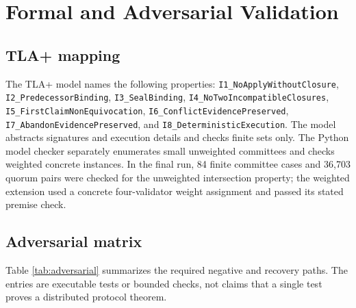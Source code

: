 \documentclass{ledger}
\begin{document}
\section{Formal and Adversarial Validation}
\subsection{TLA+ mapping}
The TLA+ model names the following properties: \texttt{I1\_NoApplyWithoutClosure}, \texttt{I2\_PredecessorBinding}, \texttt{I3\_SealBinding}, \texttt{I4\_NoTwoIncompatibleClosures}, \texttt{I5\_FirstClaimNonEquivocation}, \texttt{I6\_ConflictEvidencePreserved}, \texttt{I7\_AbandonEvidencePreserved}, and \texttt{I8\_DeterministicExecution}. The model abstracts signatures and execution details and checks finite sets only. The Python model checker separately enumerates small unweighted committees and checks weighted concrete instances. In the final run, 84 finite committee cases and 36,703 quorum pairs were checked for the unweighted intersection property; the weighted extension used a concrete four-validator weight assignment and passed its stated premise check.

\subsection{Adversarial matrix}
Table \ref{tab:adversarial} summarizes the required negative and recovery paths. The entries are executable tests or bounded checks, not claims that a single test proves a distributed protocol theorem.
\end{document}
